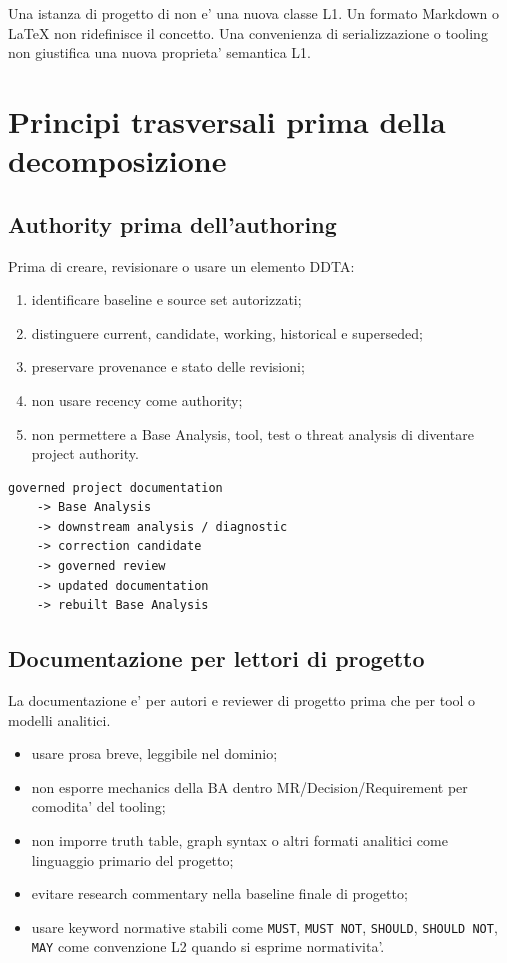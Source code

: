 \documentclass[11pt,a4paper]{article}
\begin{document}
\begin{ddtaanti}[title={Confondere metamodel e documento}]
Una istanza di progetto di \MR{} non e' una nuova classe L1. Un formato Markdown o LaTeX non ridefinisce il concetto. Una convenienza di serializzazione o tooling non giustifica una nuova proprieta' semantica L1.
\end{ddtaanti}

\section{Principi trasversali prima della decomposizione}

\subsection{Authority prima dell'authoring}
\closedtag

Prima di creare, revisionare o usare un elemento DDTA:
\begin{enumerate}
  \item identificare baseline e source set autorizzati;
  \item distinguere current, candidate, working, historical e superseded;
  \item preservare provenance e stato delle revisioni;
  \item non usare recency come authority;
  \item non permettere a Base Analysis, tool, test o threat analysis di diventare project authority.
\end{enumerate}

\begin{lstlisting}
governed project documentation
    -> Base Analysis
    -> downstream analysis / diagnostic
    -> correction candidate
    -> governed review
    -> updated documentation
    -> rebuilt Base Analysis
\end{lstlisting}

\subsection{Documentazione per lettori di progetto}
\layertwotag

La documentazione e' per autori e reviewer di progetto prima che per tool o modelli analitici.

\begin{itemize}
  \item usare prosa breve, leggibile nel dominio;
  \item non esporre mechanics della BA dentro MR/Decision/Requirement per comodita' del tooling;
  \item non imporre truth table, graph syntax o altri formati analitici come linguaggio primario del progetto;
  \item evitare research commentary nella baseline finale di progetto;
  \item usare keyword normative stabili come \texttt{MUST}, \texttt{MUST NOT}, \texttt{SHOULD}, \texttt{SHOULD NOT}, \texttt{MAY} come convenzione L2 quando si esprime normativita'.
\end{itemize}
\end{document}
